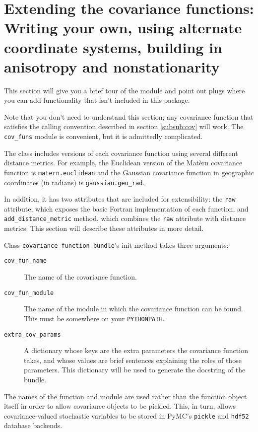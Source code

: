 \chapter{Extending the covariance functions: Writing your own, using alternate coordinate systems, building in anisotropy and nonstationarity}\label{cha:usercov}
This section will give you a brief tour of the  module and point out plugs where you can add functionality that isn't included in this package.

\bigskip
Note that you don't need to understand this section; any covariance function that satisfies the calling convention described in section \ref{subsub:cov} will work. The \texttt{cov_funs} module is convenient, but it is admittedly complicated.

\bigskip
The  class includes versions of each covariance function using several different distance metrics. For example, the Euclidean version of the Mat\`ern covariance function is \texttt{matern.euclidean} and the Gaussian covariance function in geographic coordinates (in radians) is \texttt{gaussian.geo_rad}.

In addition, it has two attributes that are included for extensibility: the \texttt{raw} attribute, which exposes the basic Fortran implementation of each function, and \texttt{add_distance_metric} method, which combines the \texttt{raw} attribute with distance metrics. This section will describe these attributes in more detail.

Class \texttt{covariance_function_bundle}'s init method takes three arguments:
\begin{description}
	\item[\texttt{cov_fun_name}] The name of the covariance function.
	\item[\texttt{cov_fun_module}] The name of the module in which the covariance function can be found. This must be somewhere on your \texttt{PYTHONPATH}.
	\item[\texttt{extra_cov_params}] A dictionary whose keys are the extra parameters the covariance function takes, and whose values are brief sentences explaining the roles of those parameters. This dictionary will be used to generate the docstring of the bundle.
\end{description}
The names of the function and module are used rather than the function object itself in order to allow covariance objects to be pickled. This, in turn, allows covariance-valued stochastic variables to be stored in PyMC's \texttt{pickle} and \texttt{hdf52} database backends.


